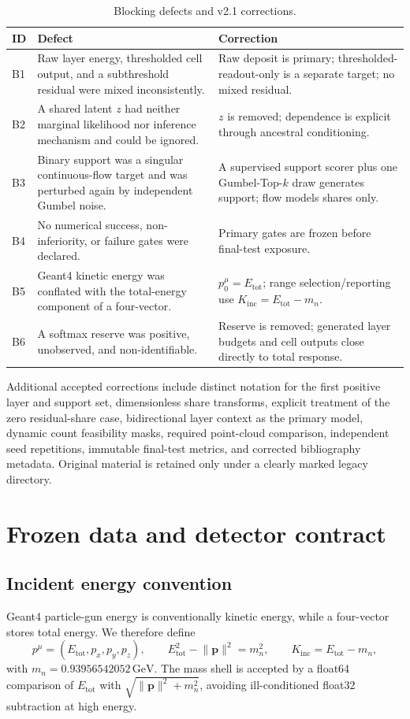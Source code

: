 \documentclass[10pt,a4paper]{article}
\newcommand{\pFour}{p^{\mu}}
\newcommand{\Kinc}{K_{\mathrm{inc}}}
\newcommand{\Etot}{E_{\mathrm{tot}}}
\newcommand{\GeV}{\,\mathrm{GeV}}
\begin{document}
\begin{table}[ht]
\centering
\caption{Blocking defects and v2.1 corrections.}
\label{tab:blockers}
\begin{tabularx}{\textwidth}{@{}p{}Y Y@{}}
\toprule
ID & Defect & Correction \\
\midrule
B1 & Raw layer energy, thresholded cell output, and a subthreshold residual were mixed inconsistently. & Raw deposit is primary; thresholded-readout-only is a separate target; no mixed residual. \\
B2 & A shared latent $z$ had neither marginal likelihood nor inference mechanism and could be ignored. & $z$ is removed; dependence is explicit through ancestral conditioning. \\
B3 & Binary support was a singular continuous-flow target and was perturbed again by independent Gumbel noise. & A supervised support scorer plus one Gumbel-Top-$k$ draw generates support; flow models shares only. \\
B4 & No numerical success, non-inferiority, or failure gates were declared. & Primary gates are frozen before final-test exposure. \\
B5 & Geant4 kinetic energy was conflated with the total-energy component of a four-vector. & $\pFour_0=\Etot$; range selection/reporting use $\Kinc=\Etot-m_n$. \\
B6 & A softmax reserve was positive, unobserved, and non-identifiable. & Reserve is removed; generated layer budgets and cell outputs close directly to total response. \\
\bottomrule
\end{tabularx}
\end{table}

Additional accepted corrections include distinct notation for the first positive layer and support set, dimensionless share transforms, explicit treatment of the zero residual-share case, bidirectional layer context as the primary model, dynamic count feasibility masks, required point-cloud comparison, independent seed repetitions, immutable final-test metrics, and corrected bibliography metadata. Original material is retained only under a clearly marked legacy directory.

\section{Frozen data and detector contract}

\subsection{Incident energy convention}
Geant4 particle-gun energy is conventionally kinetic energy, while a four-vector stores total energy. We therefore define
\begin{equation}
 \pFour=(\Etot,p_x,p_y,p_z),\qquad
 \Etot^2-\lVert\mathbf p\rVert^2=m_n^2,\qquad
 \Kinc=\Etot-m_n,
 \label{eq:energy}
\end{equation}
with $m_n=0.93956542052\GeV$. The mass shell is accepted by a float64 comparison of $\Etot$ with $\sqrt{\lVert\mathbf p\rVert^2+m_n^2}$, avoiding ill-conditioned float32 subtraction at high energy.
\end{document}
